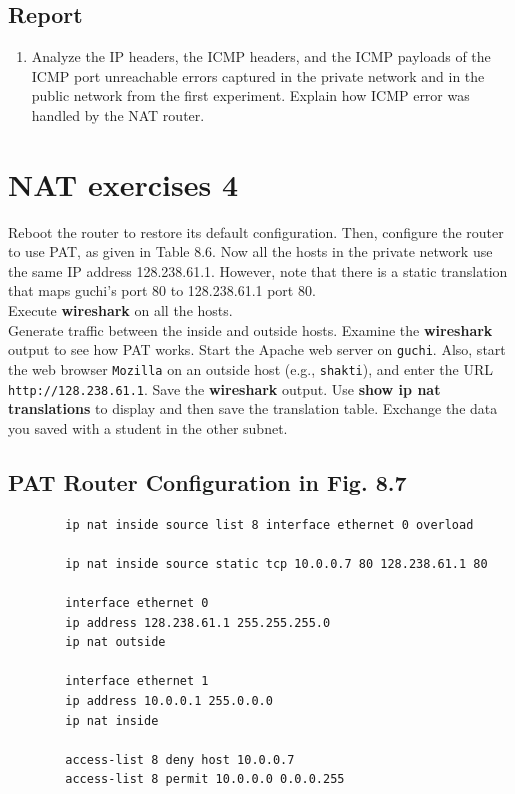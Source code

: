 \documentclass[10pt,a4paper]{article}
\numberwithin{equation}{section}
\numberwithin{figure}{section}
\numberwithin{table}{section}
\begin{document}
    \subsection*{Report}
    \begin{enumerate}
        \item Analyze the IP headers, the ICMP headers, and the ICMP payloads of the ICMP port unreachable errors captured in the private network and in the public network from the first experiment.
        Explain how ICMP error was handled by the NAT router.
    \end{enumerate}

    \section*{NAT exercises 4}
    Reboot the router to restore its default configuration.
    Then, configure the router to use PAT, as given in Table 8.6. Now all the hosts in the private network use the same IP address 128.238.61.1. However, note that there is a static translation that maps guchi’s port 80 to 128.238.61.1 port 80. \\
    Execute \textbf{wireshark} on all the hosts. \\
    Generate traffic between the inside and outside hosts.
    Examine the \textbf{wireshark} output to see how PAT works.
    Start the Apache web server on \texttt{guchi}. Also, start the web browser \texttt{Mozilla} on an outside host (e.g., \texttt{shakti}), and enter the URL \texttt{http://128.238.61.1}. Save the \textbf{wireshark} output.
    Use \textbf{show ip nat translations} to display and then save the translation table.
    Exchange the data you saved with a student in the other subnet.
    \subsection*{PAT Router Configuration in Fig. 8.7}
    \begin{verbatim}
        ip nat inside source list 8 interface ethernet 0 overload

        ip nat inside source static tcp 10.0.0.7 80 128.238.61.1 80

        interface ethernet 0
        ip address 128.238.61.1 255.255.255.0
        ip nat outside

        interface ethernet 1
        ip address 10.0.0.1 255.0.0.0
        ip nat inside

        access-list 8 deny host 10.0.0.7
        access-list 8 permit 10.0.0.0 0.0.0.255
    \end{verbatim}
\end{document}
